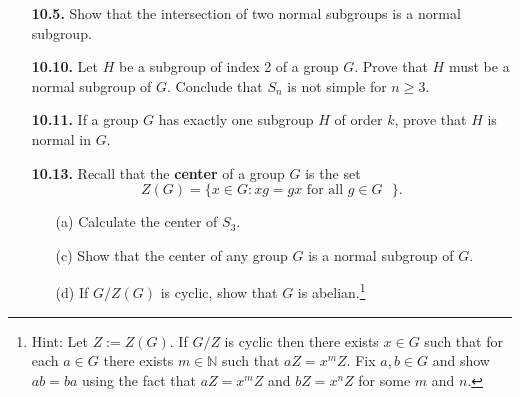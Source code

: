 \documentclass[12pt,reqno]{amsart}
\newcommand{\N}{\ensuremath{\mathbb{N}}}
\newcommand{\<}{\ensuremath{\langle}}
\renewcommand{\>}{\ensuremath{\rangle}}
\begin{document}
\begin{enumerate}
\vfill

\item[{\bf 10.5.}]
Show that the intersection of two normal subgroups is a normal
subgroup. 
 
\vfill

\item[{\bf 10.10.}]
Let $H$ be a subgroup of index 2 of a group $G$. Prove that $H$ must
be a normal subgroup of $G$. Conclude that $S_n$ is not simple for $n \geq 3$.

\vfill

\item[{\bf 10.11.}]
If a group $G$ has exactly one subgroup $H$ of order $k$, prove that
$H$ is normal in $G$. 

\vfill

\item[{\bf 10.13.}]
Recall that the {\bf center} of a group $G$ is the set 
\[
Z(G) = \{ x \in G : xg = gx \text{ for all $g \in G$ } \}.
\]
\begin{enumerate}
\item[(a)]
Calculate the center of $S_3$.
\item[(c)]
Show that the center of any group $G$ is a normal subgroup of $G$. 
 \item[(d)]
If $G / Z(G)$ is cyclic, show that $G$ is abelian.\footnote{Hint: Let $Z := Z(G)$.  If
  $G/Z$ is cyclic then there exists $x\in G$ such that for each $a\in G$ 
  there exists $m\in \N$ such that $aZ = x^mZ$.
  Fix $a, b\in G$ and show $ab = ba$ using the fact that $aZ = x^mZ$ and
  $bZ = x^nZ$ for some $m$ and $n$.}
\end{enumerate}
\vfill 

\end{enumerate}
\end{document}
